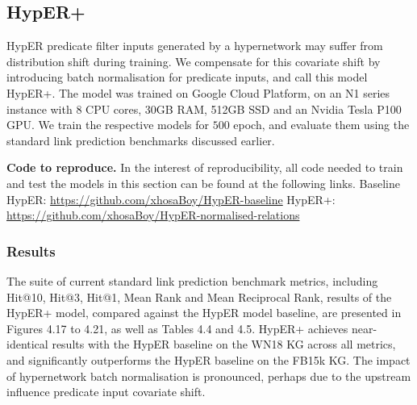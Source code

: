 
\subsection{HypER+}
HypER predicate filter inputs generated by a hypernetwork may suffer from distribution shift during training. We compensate for this covariate shift by introducing batch normalisation for predicate inputs, and call this model HypER+. The model was trained on Google Cloud Platform, on an N1 series instance with  8 CPU cores, 30GB RAM, 512GB SSD and an Nvidia Tesla P100 GPU. We train the respective models for $ 500 $ epoch, and evaluate them using the standard link prediction benchmarks discussed earlier. \par

\noindent \textbf{Code to reproduce.} In the interest of reproducibility, all code needed to train and test the models in this section can be found at the following links. \newline
Baseline HypER: \url{https://github.com/xhosaBoy/HypER-baseline} \newline
HypER+: \url{https://github.com/xhosaBoy/HypER-normalised-relations} 

\subsubsection{Results}

The suite of current standard link prediction benchmark metrics, including Hit@10, Hit@3, Hit@1, Mean Rank and Mean Reciprocal Rank, results of the HypER+ model, compared against the HypER model baseline, are presented in Figures 4.17 to 4.21, as well as Tables 4.4 and 4.5. HypER+ achieves near-identical results with the HypER baseline on the WN18 KG across all metrics, and significantly outperforms the HypER baseline on the FB15k KG. The impact of hypernetwork batch normalisation is pronounced, perhaps due to the upstream influence predicate input covariate shift. \par

\smallskip


